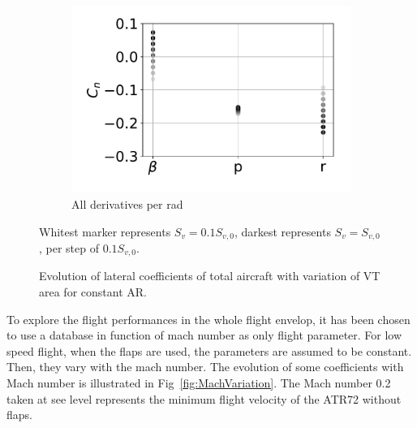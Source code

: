\begin{figure}[hbt!]
\begin{subfigure}[b]{0.33\textwidth}
		\includegraphics[width=\textwidth]{CnCstAR}
		\caption{All derivatives per rad}
		\label{fig:CnCstAR}
	\end{subfigure}
	\caption{Evolution of lateral coefficients of total aircraft with variation of VT area for constant AR.} Whitest marker represents $S_v=0.1S_{v,0}$, darkest represents $S_v=S_{v,0}$, per step of $0.1S_{v,0}$.\label{fig:cstAR}
\end{figure}

To explore the flight performances in the whole flight envelop, it has been chosen to use a database in function of mach number as only flight parameter. For low speed flight, when the flaps are used, the parameters are assumed to be constant. Then, they vary with the mach number. The evolution of some coefficients with Mach number is illustrated in Fig~\ref{fig:MachVariation}. The Mach number 0.2 taken at see level represents the minimum flight velocity of the ATR72 without flaps.

